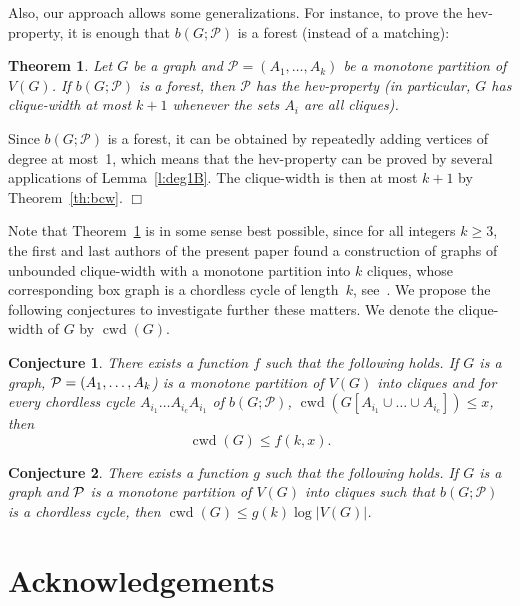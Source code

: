 \documentclass[12pt]{article}
\newtheorem{Theorem}{Theorem}[section]
\newtheorem{Conjecture}{Conjecture}[section]
\newcommand{\qed}{\hfill $\Box$}
\DeclareMathOperator{\cwd}{cwd}
\begin{document}
Also, our approach allows some generalizations. For instance, to prove the hev-property, it is enough that $b(G;\mathcal{P})$ is a forest (instead of a matching):

\begin{Theorem}\label{thm:box}
	Let $G$ be a graph and $\mathcal P = (A_1, \dots, A_k)$ be a monotone partition of $V(G)$.  
	If $b(G;\mathcal{P})$ is a forest, then $\mathcal P$ has the hev-property (in particular, $G$ has clique-width at most $k+1$ whenever the sets $A_i$ are all cliques).
\end{Theorem}

Since $b(G;\mathcal{P})$ is a forest, it can be obtained by repeatedly adding vertices of degree at most~1, which means that the hev-property can be proved by several applications of Lemma~\ref{l:deg1B}. The clique-width is then at most $k+1$ by Theorem~\ref{th:bcw}.
\qed


\medskip

Note that Theorem~\ref{thm:box} is in some sense best possible, since for all integers $k\geq 3$, the first and last authors of the present paper found a construction of graphs of unbounded clique-width with a monotone partition into $k$ cliques, whose corresponding box graph is a chordless cycle of length~$k$, see~\cite{DBLP:journals/dm/HoangT24}. 
We propose the following conjectures to investigate further these matters.  We denote the clique-width of $G$ by $\cwd(G)$. 


\begin{Conjecture}
	There exists a function $f$ such that the following holds.
	If $G$ is a graph, ${\cal P} = (A_1, \ldots, A_k$) is
	a monotone partition of $V(G)$ into cliques and for
	every chordless cycle $A_{i_1} \dots A_{i_c} A_{i_1}$ of
	$b(G;\mathcal{P})$, $\cwd(G[A_{i_1} \cup \dots \cup A_{i_c}]) \leq x$,
	then $$\cwd(G) \leq f(k, x).$$
\end{Conjecture}


\begin{Conjecture}
	There exists a function $g$ such that the following holds.
	If $G$ is a graph and ${\cal P}$ is a monotone partition of $V(G)$ into cliques such that $b(G;\mathcal{P})$ is a chordless cycle, then
	$\cwd(G) \leq g(k) \log |V(G)|$.
\end{Conjecture}



\section*{Acknowledgements}
\end{document}
